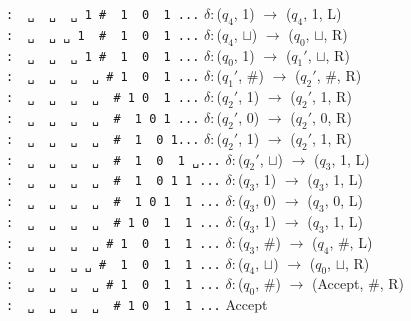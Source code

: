 \texttt{:\ \ ␣\ \ ␣\ \ ␣\ \textbar{}1\textbar{}\ \#\ \ 1\ \ 0\ \ 1\ ...}
\(\delta:\)(\(q_4\), 1) \(\to\) (\(q_4\), 1, L)\\
\texttt{:\ \ ␣\ \ ␣\ \textbar{}␣\textbar{}\ 1\ \ \#\ \ 1\ \ 0\ \ 1\ ...}
\(\delta:\)(\(q_4\), \(\sqcup\)) \(\to\) (\(q_0\), \(\sqcup\), R)\\
\texttt{:\ \ ␣\ \ ␣\ \ ␣\ \textbar{}1\textbar{}\ \#\ \ 1\ \ 0\ \ 1\ ...}
\(\delta:\)(\(q_0\), 1) \(\to\) (\(q_1'\), \(\sqcup\), R)\\
\texttt{:\ \ ␣\ \ ␣\ \ ␣\ \ ␣\ \textbar{}\#\textbar{}\ 1\ \ 0\ \ 1\ ...}
\(\delta:\)(\(q_1'\), \#) \(\to\) (\(q_2'\), \#, R)\\
\texttt{:\ \ ␣\ \ ␣\ \ ␣\ \ ␣\ \ \#\ \textbar{}1\textbar{}\ 0\ \ 1\ ...}
\(\delta:\)(\(q_2'\), 1) \(\to\) (\(q_2'\), 1, R)\\
\texttt{:\ \ ␣\ \ ␣\ \ ␣\ \ ␣\ \ \#\ \ 1\ \textbar{}0\textbar{}\ 1\ ...}
\(\delta:\)(\(q_2'\), 0) \(\to\) (\(q_2'\), 0, R)\\
\texttt{:\ \ ␣\ \ ␣\ \ ␣\ \ ␣\ \ \#\ \ 1\ \ 0\ \textbar{}1\textbar{}...}
\(\delta:\)(\(q_2'\), 1) \(\to\) (\(q_2'\), 1, R)\\
\texttt{:\ \ ␣\ \ ␣\ \ ␣\ \ ␣\ \ \#\ \ 1\ \ 0\ \ 1\ \textbar{}␣\textbar{}...}
\(\delta:\)(\(q_2'\), \(\sqcup\)) \(\to\) (\(q_3\), 1, L)\\
\texttt{:\ \ ␣\ \ ␣\ \ ␣\ \ ␣\ \ \#\ \ 1\ \ 0\ \textbar{}1\textbar{}\ 1\ ...}
\(\delta:\)(\(q_3\), 1) \(\to\) (\(q_3\), 1, L)\\
\texttt{:\ \ ␣\ \ ␣\ \ ␣\ \ ␣\ \ \#\ \ 1\ \textbar{}0\textbar{}\ 1\ \ 1\ ...}
\(\delta:\)(\(q_3\), 0) \(\to\) (\(q_3\), 0, L)\\
\texttt{:\ \ ␣\ \ ␣\ \ ␣\ \ ␣\ \ \#\ \textbar{}1\textbar{}\ 0\ \ 1\ \ 1\ ...}
\(\delta:\)(\(q_3\), 1) \(\to\) (\(q_3\), 1, L)\\
\texttt{:\ \ ␣\ \ ␣\ \ ␣\ \ ␣\ \textbar{}\#\textbar{}\ 1\ \ 0\ \ 1\ \ 1\ ...}
\(\delta:\)(\(q_3\), \#) \(\to\) (\(q_4\), \#, L)\\
\texttt{:\ \ ␣\ \ ␣\ \ ␣\ \textbar{}␣\textbar{}\ \#\ \ 1\ \ 0\ \ 1\ \ 1\ ...}
\(\delta:\)(\(q_4\), \(\sqcup\)) \(\to\) (\(q_0\), \(\sqcup\), R)\\
\texttt{:\ \ ␣\ \ ␣\ \ ␣\ \ ␣\ \textbar{}\#\textbar{}\ 1\ \ 0\ \ 1\ \ 1\ ...}
\(\delta:\)(\(q_0\), \#) \(\to\) (Accept, \#, R)\\
\texttt{:\ \ ␣\ \ ␣\ \ ␣\ \ ␣\ \ \#\ \textbar{}1\textbar{}\ 0\ \ 1\ \ 1\ ...}
Accept
